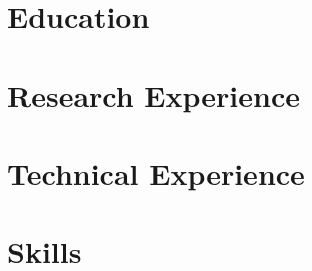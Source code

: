 \documentclass[10pt]{article}
\begin{document}
    \section{Education}
    

    \section{Research Experience}
    

    \section{Technical Experience}
    

    \section{Skills}
    
\end{document}
